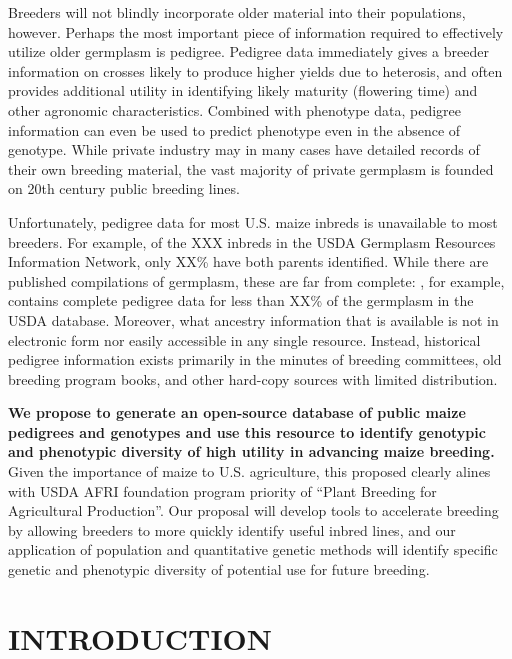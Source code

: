\documentclass[12pt]{article}
\begin{document}
Breeders will not blindly incorporate older material into their populations, however.  
Perhaps the most important piece of information required to effectively utilize older germplasm is pedigree.
Pedigree data immediately gives a breeder information on crosses likely to produce higher yields due to heterosis, and often provides additional utility in identifying likely maturity (flowering time) and other agronomic characteristics. 
Combined with phenotype data, pedigree information can even be used to predict phenotype even in the absence of genotype.
While private industry may in many cases have detailed records of their own breeding material, the vast majority of private germplasm is founded on 20th century public breeding lines.

Unfortunately, pedigree data for most U.S. maize inbreds is unavailable to most breeders. 
For example, of the XXX inbreds in the USDA Germplasm Resources Information Network, only XX\% have both parents identified. 
While there are published compilations of germplasm, these are far from complete:  \citet{gerdes1993compilation}, for example, contains complete pedigree data for less than XX\% of the germplasm in the USDA database.
Moreover, what ancestry information that is available is not in electronic form nor easily accessible in any single resource.  
Instead, historical pedigree information exists primarily in the minutes of breeding committees, old breeding program books, and other hard-copy sources with limited distribution.  

{\bf We propose to  generate an open-source database of public maize pedigrees and genotypes and use this resource to identify genotypic and phenotypic diversity of high utility in advancing maize breeding.}
Given the importance of maize to U.S. agriculture, this proposed clearly alines with USDA AFRI foundation program priority of ``Plant Breeding for Agricultural Production''.  
Our proposal will develop tools to accelerate breeding by allowing breeders to more quickly identify useful inbred lines, and our application of population and quantitative genetic methods will identify specific genetic and phenotypic diversity of potential use for future breeding.  

\section*{INTRODUCTION}
\label{S:1}
\end{document}
